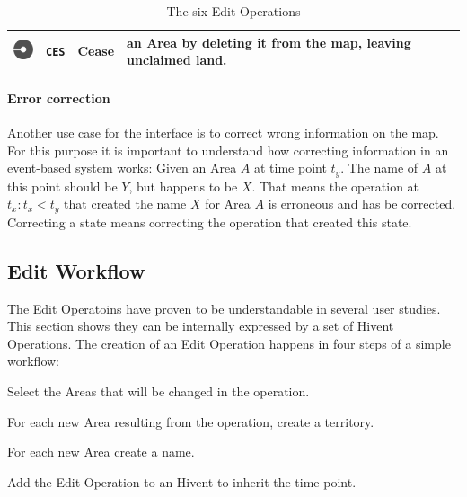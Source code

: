 \begin{table}[H]
\begin{center}
\begin{tabular}{m{0.75cm} m{0.8cm} m{2.4cm} m{9.1cm}}
  \midrule
  \vspace{0.35em}
  \raisebox{-0.35\height}
  {\includegraphics[width=0.72cm]{graphics/development/editing_hivent_data/edit_operations/CES}} &
  \texttt{CES} & Cease &
  an Area by deleting it from the map, leaving unclaimed land. \\

  \bottomrule
\end{tabular}
\caption{The six Edit Operations}
\label{tab:edit_operations}
\end{center}
\end{table}

\paragraph{Error correction} %
\label{par:error_correction}

Another use case for the interface is to correct wrong information on the map. For this purpose it is important to understand how correcting information in an event-based system works: Given an Area $A$ at time point $t_y$. The name of $A$ at this point should be $Y$, but happens to be $X$. That means the operation at $t_x: t_x < t_y$ that created the name $X$ for Area $A$ is erroneous and has be corrected. Correcting a state means correcting the operation that created this state.



\subsection{Edit Workflow} %
\label{sub:edit_workflow}

The Edit Operatoins have proven to be understandable in several user studies. This section shows they can be internally expressed by a set of Hivent Operations. The creation of an Edit Operation happens in four steps of a simple workflow:

\begin{compactenum}
  \item Select the Areas that will be changed in the operation.
  \item For each new Area resulting from the operation, create a territory.
  \item For each new Area create a name.
  \item Add the Edit Operation to an Hivent to inherit the time point.
\end{compactenum}


